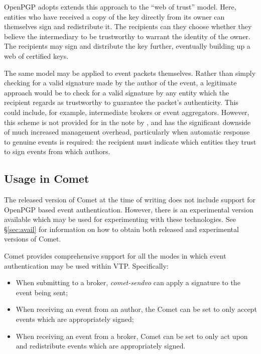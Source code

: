 \documentclass[5p,authoryear]{elsarticle}
\begin{document}
OpenPGP adopts extends this approach to the ``web of trust'' model. Here,
entities who have received a copy of the key directly from its owner can
themselves sign and redistribute it. The recipients can they choose whether
they believe the intermediary to be trustworthy to warrant the identity of the
owner. The recipients may sign and distribute the key further, eventually
building up a web of certified keys.

The same model may be applied to event packets themselves. Rather than simply
checking for a valid signature made by the author of the event, a legitimate
approach would be to check for a valid signature by any entity which the
recipient regards as trustworthy to guarantee the packet's authenticity. This
could include, for example, intermediate brokers or event aggregators.
However, this scheme is not provided for in the note by
\citeauthor{Denny:2008}, and has the significant downside of much increased
management overhead, particularly when automatic response to genuine events is
required: the recipient must indicate which entities they trust to sign events
from which authors.

\subsection{Usage in Comet}

The released version of Comet at the time of writing does not include support
for OpenPGP based event authentication. However, there is an experimental
version available which may be used for experimenting with these technologies.
See \S\ref{sec:avail} for information on how to obtain both released and
experimental versions of Comet.

Comet provides comprehensive support for all the modes in which event
authentication may be used within VTP. Specifically:

\begin{itemize}

  \item{When submitting to a broker, \textit{comet-sendvo} can apply a
  signature to the event being sent;}

  \item{When receiving an event from an author, the Comet can be set to
  only accept events which are appropriately signed;}

  \item{When receiving an event from a broker, Comet can be set to only act
  upon and redistribute events which are appropriately signed.}

\end{itemize}
\end{document}
